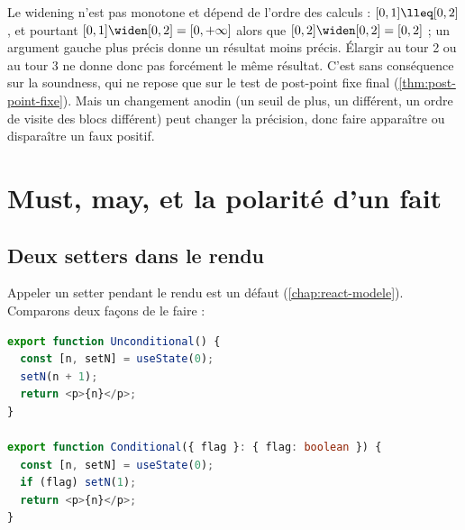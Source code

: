 \begin{piege}
  Le widening n'est pas monotone et dépend de l'ordre des calculs :
  $[0,1] \lleq [0,2]$, et pourtant $[0,1] \widen [0,2] = [0,+\infty]$ alors
  que $[0,2] \widen [0,2] = [0,2]$ ; un argument gauche plus précis donne un
  résultat moins précis. Élargir au tour 2 ou au tour 3 ne donne donc pas
  forcément le même résultat. C'est
  sans conséquence sur la soundness, qui ne repose que sur le test de
  post-point fixe final (\cref{thm:post-point-fixe}). Mais un changement
  anodin (un seuil de plus, un  différent, un ordre de
  visite des blocs différent) peut changer la précision, donc faire
  apparaître ou disparaître un faux positif.
\end{piege}

\section{Must, may, et la polarité d'un fait}
\label{sec:interpretation-abstraite-must-may}

\subsection{Deux setters dans le rendu}

Appeler un setter pendant le rendu est un défaut (\cref{chap:react-modele}).
Comparons deux façons de le faire :

\begin{lstlisting}[language=TypeScript,caption={Un setter dans le rendu, inconditionnel puis conditionnel (\file{/tmp/ch03/setter.tsx}, élagué de sa ligne d'import)},label={lst:interpretation-abstraite-setter}]
export function Unconditional() {
  const [n, setN] = useState(0);
  setN(n + 1);
  return <p>{n}</p>;
}

export function Conditional({ flag }: { flag: boolean }) {
  const [n, setN] = useState(0);
  if (flag) setN(1);
  return <p>{n}</p>;
}
\end{lstlisting}


